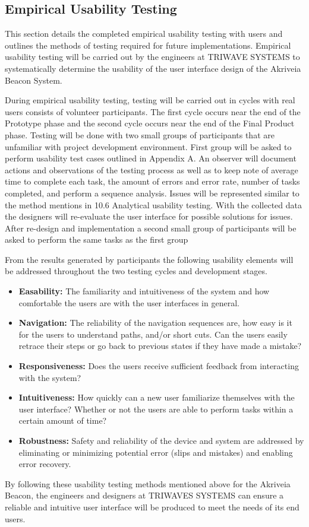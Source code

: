 

\subsection{Empirical Usability Testing}
\medskip
This section details the completed empirical usability testing with users and outlines the methods of testing required for future implementations. Empirical usability testing will be carried out by the engineers at TRIWAVE SYSTEMS to systematically determine the usability of the user interface design of the Akriveia Beacon System. 

\bigskip
During empirical usability testing, testing will be carried out in cycles with real users consists of volunteer participants. The first cycle occurs near the end of the Prototype phase and the second cycle occurs near the end of the Final Product phase. Testing will be done with two small groups of participants that are unfamiliar with project development environment. First group will be asked to perform usability test cases outlined in Appendix A. An observer will document actions and observations of the testing process as well as to keep note of average time to complete each task, the amount of errors and error rate, number of tasks completed, and perform a sequence analysis. Issues will be represented similar to the method mentions in 10.6 Analytical usability testing. With the collected data the designers will re-evaluate the user interface for possible solutions for issues. After re-design and implementation a second small group of participants will be asked to perform the same tasks as the first group

\bigskip
From the results generated by participants the following usability elements will be addressed throughout the two testing cycles and development stages. 

\medskip
\begin{itemize}
\setlength\itemsep{0.1mm}
	\item \textbf{Easability:} The familiarity and intuitiveness of the system and how comfortable the users are with the user interfaces in general. 
	\item \textbf{Navigation:} The reliability of the navigation sequences are, how easy is it for the users to understand paths, and/or short cuts. Can the users easily retrace their steps or go back to previous states if they have made a mistake?
	\item \textbf{Responsiveness:} Does the users receive sufficient feedback from interacting with the system? 
	\item \textbf{Intuitiveness:} How quickly can a new user familiarize themselves with the user interface? Whether or not the users are able to perform tasks within a certain amount of time?
	\item \textbf{Robustness:} Safety and reliability of the device and system are addressed by eliminating or minimizing potential error (slips and mistakes) and enabling error recovery.
\end{itemize}

\medskip
By following these usability testing methods mentioned above for the Akriveia Beacon, the engineers and designers at TRIWAVES SYSTEMS can ensure a reliable and intuitive user interface will be produced to meet the needs of its end users. 
